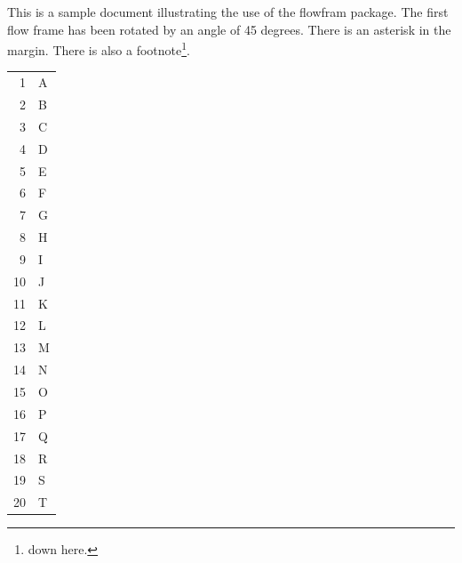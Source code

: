 \documentclass[a4paper]{article}
\begin{document}
This is a sample document illustrating the use of the
flowfram package. The first flow frame has been rotated
by an angle of 45 degrees. There is an asterisk in the
margin\marginpar{*}. There is also a 
footnote\footnote{down here.}.

\framebreak
\begin{supertabular}{rl}
1 & A\\
2 & B\\
3 & C\\
4 & D\\
5 & E\\
6 & F\\
7 & G\\
8 & H\\
9 & I\\
10 & J\\
11 & K\\
12 & L\\
13 & M\\
14 & N\\
15 & O\\
16 & P\\
17 & Q\\
18 & R\\
19 & S\\
20 & T\\
\end{supertabular}
\end{document}
